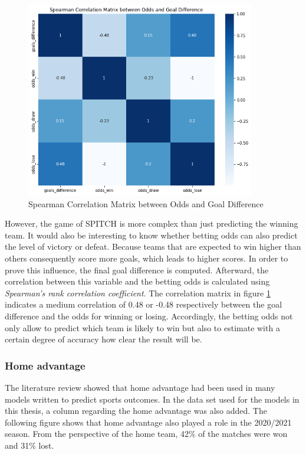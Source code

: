 \begin{figure}[H]
    \centering
    \includegraphics[width=10cm]{chapter/4_implementation/section/2_data/section/figures/correlation_matrix_odds_goal_diff.png}
    \captionsetup{justification=centering}
    \caption{Spearman Correlation Matrix between Odds and Goal Difference}
    \label{fig:correlation_matrix_odds_goal_diff}
\end{figure}

However, the game of SPITCH is more complex than just predicting the winning team. It would also be interesting to know whether betting odds can also predict the level of victory or defeat. Because teams that are expected to win higher than others consequently score more goals, which leads to higher scores. In order to prove this influence, the final goal difference is computed. Afterward, the correlation between this variable and the betting odds is calculated using \emph{Spearman's rank correlation coefficient}. The correlation matrix in figure \ref{fig:correlation_matrix_odds_goal_diff} indicates a medium correlation of 0.48 or -0.48 respectively between the goal difference and the odds for winning or losing. Accordingly, the betting odds not only allow to predict which team is likely to win but also to estimate with a certain degree of accuracy how clear the result will be. 

\subsubsection{Home advantage}

The literature review showed that home advantage had been used in many models written to predict sports outcomes. In the data set used for the models in this thesis, a column regarding the home advantage was also added. The following figure shows that home advantage also played a role in the 2020/2021 season. From the perspective of the home team, 42\% of the matches were won and 31\% lost. 

